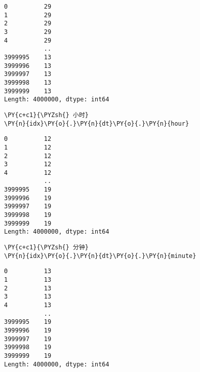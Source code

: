             \begin{tcolorbox}[breakable, size=fbox, boxrule=.5pt, pad at break*=1mm, opacityfill=0]
\begin{Verbatim}[commandchars=\\\{\}]
0          29
1          29
2          29
3          29
4          29
           ..
3999995    13
3999996    13
3999997    13
3999998    13
3999999    13
Length: 4000000, dtype: int64
\end{Verbatim}
\end{tcolorbox}
        
    \begin{tcolorbox}[breakable, size=fbox, boxrule=1pt, pad at break*=1mm,colback=cellbackground, colframe=cellborder]
\begin{Verbatim}[commandchars=\\\{\}]
\PY{c+c1}{\PYZsh{} 小时}
\PY{n}{idx}\PY{o}{.}\PY{n}{dt}\PY{o}{.}\PY{n}{hour}
\end{Verbatim}
\end{tcolorbox}

            \begin{tcolorbox}[breakable, size=fbox, boxrule=.5pt, pad at break*=1mm, opacityfill=0]
\begin{Verbatim}[commandchars=\\\{\}]
0          12
1          12
2          12
3          12
4          12
           ..
3999995    19
3999996    19
3999997    19
3999998    19
3999999    19
Length: 4000000, dtype: int64
\end{Verbatim}
\end{tcolorbox}
        
    \begin{tcolorbox}[breakable, size=fbox, boxrule=1pt, pad at break*=1mm,colback=cellbackground, colframe=cellborder]
\begin{Verbatim}[commandchars=\\\{\}]
\PY{c+c1}{\PYZsh{} 分钟}
\PY{n}{idx}\PY{o}{.}\PY{n}{dt}\PY{o}{.}\PY{n}{minute}
\end{Verbatim}
\end{tcolorbox}

            \begin{tcolorbox}[breakable, size=fbox, boxrule=.5pt, pad at break*=1mm, opacityfill=0]
\begin{Verbatim}[commandchars=\\\{\}]
0          13
1          13
2          13
3          13
4          13
           ..
3999995    19
3999996    19
3999997    19
3999998    19
3999999    19
Length: 4000000, dtype: int64
\end{Verbatim}
\end{tcolorbox}
        
